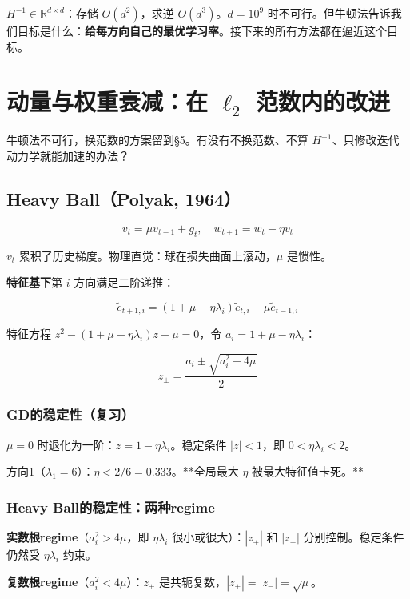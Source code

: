 \documentclass[12pt,a4paper]{article}
\begin{document}
$H^{-1} \in \mathbb{R}^{d \times d}$：存储 $O(d^2)$，求逆 $O(d^3)$。$d = 10^9$ 时不可行。但牛顿法告诉我们目标是什么：\textbf{给每方向自己的最优学习率}。接下来的所有方法都在逼近这个目标。




\section{动量与权重衰减：在 $\ell_2$ 范数内的改进}

牛顿法不可行，换范数的方案留到§5。有没有不换范数、不算 $H^{-1}$、只修改迭代动力学就能加速的办法？


\subsection{Heavy Ball（Polyak, 1964）}


\[v_t = \mu v_{t-1} + g_t, \quad w_{t+1} = w_t - \eta v_t\]

$v_t$ 累积了历史梯度。物理直觉：球在损失曲面上滚动，$\mu$ 是惯性。

\textbf{特征基下}第 $i$ 方向满足二阶递推：


\[\tilde{e}_{t+1,i} = (1 + \mu - \eta\lambda_i)\tilde{e}_{t,i} - \mu\tilde{e}_{t-1,i}\]

特征方程 $z^2 - (1+\mu-\eta\lambda_i)z + \mu = 0$，令 $a_i = 1+\mu-\eta\lambda_i$：


\[z_\pm = \frac{a_i \pm \sqrt{a_i^2 - 4\mu}}{2}\]


\subsubsection{GD的稳定性（复习）}

$\mu = 0$ 时退化为一阶：$z = 1 - \eta\lambda_i$。稳定条件 $|z| < 1$，即 $0 < \eta\lambda_i < 2$。

方向1（$\lambda_1=6$）：$\eta < 2/6 = 0.333$。**全局最大 $\eta$ 被最大特征值卡死。**


\subsubsection{Heavy Ball的稳定性：两种regime}

\textbf{实数根regime}（$a_i^2 > 4\mu$，即 $\eta\lambda_i$ 很小或很大）：$|z_+|$ 和 $|z_-|$ 分别控制。稳定条件仍然受 $\eta\lambda_i$ 约束。

\textbf{复数根regime}（$a_i^2 < 4\mu$）：$z_\pm$ 是共轭复数，$|z_+| = |z_-| = \sqrt\mu$。
\end{document}
